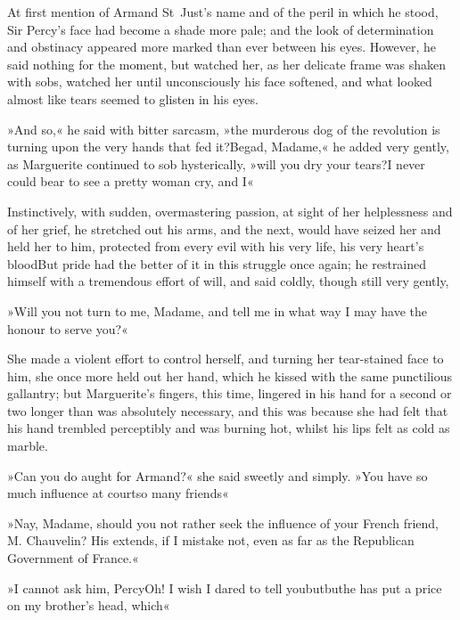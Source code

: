At first mention of Armand St~Just's name and of the peril in which he stood, Sir Percy's face had become a shade more pale; and the look of determination and obstinacy appeared more marked than ever between his eyes. However, he said nothing for the moment, but watched her, as her delicate frame was shaken with sobs, watched her until unconsciously his face softened, and what looked almost like tears seemed to glisten in his eyes.

»And so,« he said with bitter sarcasm, »the murderous dog of the revolution is turning upon the very hands that fed it?\textellipsis \allowbreak  Begad, Madame,« he added very gently, as Marguerite continued to sob hysterically, »will you dry your tears?\textellipsis \allowbreak  I never could bear to see a pretty woman cry, and I\textellipsis«

Instinctively, with sudden, overmastering passion, at sight of her helplessness and of her grief, he stretched out his arms, and the next, would have seized her and held her to him, protected from every evil with his very life, his very heart's blood\textellipsis \allowbreak  But pride had the better of it in this struggle once again; he restrained himself with a tremendous effort of will, and said coldly, though still very gently,\longdash


»Will you not turn to me, Madame, and tell me in what way I may have the honour to serve you?«

She made a violent effort to control herself, and turning her tear-stained face to him, she once more held out her hand, which he kissed with the same punctilious gallantry; but Marguerite's fingers, this time, lingered in his hand for a second or two longer than was absolutely necessary, and this was because she had felt that his hand trembled perceptibly and was burning hot, whilst his lips felt as cold as marble.

»Can you do aught for Armand?« she said sweetly and simply. »You have so much influence at court\textellipsis \allowbreak  so many friends\textellipsis«

»Nay, Madame, should you not rather seek the influence of your French friend, M. Chauvelin? His extends, if I mistake not, even as far as the Republican Government of France.«

»I cannot ask him, Percy\textellipsis \allowbreak  Oh! I wish I dared to tell you\textellipsis \allowbreak  but\textellipsis \allowbreak  \allowbreak but\textellipsis \allowbreak  \allowbreak he has put a price on my brother's head, which\textellipsis«

